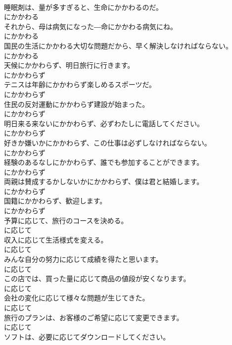 \documentclass[8pt]{extreport}
\begin{document}
\begin{CJK}{UTF8}{min}
\\	睡眠剤は、量が多すぎると、生命にかかわるのだ。	
\\	にかかわる	
\\	それから、母は病気になった―命にかかわる病気にね。	
\\	にかかわる	
\\	国民の生活にかかわる大切な問題だから、早く解決しなければならない。	
\\	にかかわる	
\\	天候にかかわらず、明日旅行に行きます。	
\\	にかかわらず	
\\	テニスは年齢にかかわらず楽しめるスポーツだ。	
\\	にかかわらず	
\\	住民の反対運動にかかわらず建設が始まった。	
\\	にかかわらず	
\\	明日来る来ないにかかわらず、必ずわたしに電話してください。	
\\	にかかわらず	
\\	好きか嫌いかにかかわらず、この仕事は必ずしなければならない。	
\\	にかかわらず	
\\	経験のあるなしにかかわらず、誰でも参加することができます。	
\\	にかかわらず	
\\	両親は賛成するかしないかにかかわらず、僕は君と結婚します。	
\\	にかかわらず	
\\	国籍にかかわらず、歓迎します。	
\\	にかかわらず	
\\	予算に応じて、旅行のコースを決める。	
\\	に応じて	
\\	収入に応じて生活様式を変える。	
\\	に応じて	
\\	みんな自分の努力に応じて成績を得たと思います。	
\\	に応じて	
\\	この店では、買った量に応じて商品の値段が安くなります。	
\\	に応じて	
\\	会社の変化に応じて様々な問題が生じてきた。	
\\	に応じて	
\\	旅行のプランは、お客様のご希望に応じて変更できます。	
\\	に応じて	
\\	ソフトは、必要に応じてダウンロードしてください。	

\end{CJK}
\end{document}
